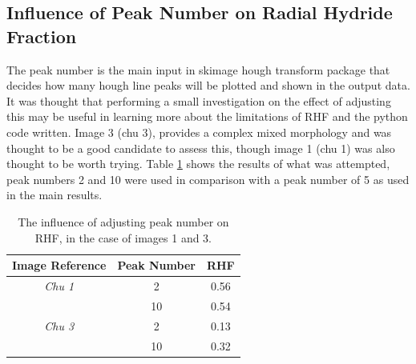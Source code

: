 \documentclass{article}
\begin{document}
\subsection{Influence of Peak Number on Radial Hydride Fraction}

    The peak number is the main input in skimage hough transform package that decides how many hough line peaks will be plotted and shown in the output data. It was thought that performing a small investigation on the effect of adjusting this may be useful in learning more about the limitations of RHF and the python code written. Image 3 (chu 3), provides a complex mixed morphology and was thought to be a good candidate to assess this, though image 1 (chu 1) was also thought to be worth trying. Table \ref{tab:peakno_tests} shows the results of what was attempted, peak numbers 2 and 10 were used in comparison with a peak number of 5 as used in the main results.

    \begin{table}[h]
        \centering
        \begin{tabular}{|c|c|c|}
        \hline
        \multicolumn{1}{|l|}{\textbf{Image Reference}} & \textbf{Peak Number} & \textbf{RHF} \\ \hline
        \multirow{}{}{\textit{Chu 1}}                & 2                    & 0.56         \\ 
                                                      & 10                   & 0.54         \\ \hline
        \multirow{}{}{\textit{Chu 3}}                & 2                    & 0.13         \\ 
                                                      & 10                   & 0.32         \\ \hline
        \end{tabular}
        \caption{The influence of adjusting peak number on RHF, in the case of images 1 and 3.}
        \label{tab:peakno_tests}
    \end{table}
    
\end{document}
